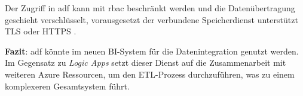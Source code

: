 Der Zugriff in \ac{adf} kann mit \ac{rbac} beschränkt werden \cite{msdoc_21_adf_security} und die Datenübertragung geschieht verschlüsselt, vorausgesetzt der verbundene Speicherdienst unterstützt TLS oder HTTPS \cite{baldwin_azure_adf_2021}.

\textbf{Fazit}: \ac{adf} könnte im neuen BI-System für die Datenintegration genutzt werden. Im Gegensatz zu \textit{Logic Apps} setzt dieser Dienst auf die Zusammenarbeit mit weiteren Azure Ressourcen, um den ETL-Prozess durchzuführen, was zu einem komplexeren Gesamtsystem führt.





